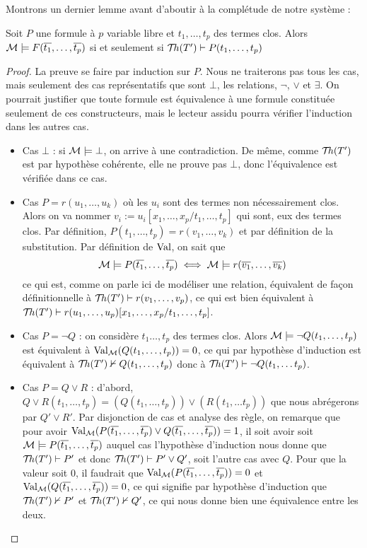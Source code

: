 Montrons un dernier lemme avant d'aboutir à la complétude de notre système :

\begin{lem}
    Soit $P$ une formule à $p$ variable libre et $t_1,\ldots, t_p$ des termes clos. Alors $\mathcal M\models F(\overline{t_1},\ldots,\overline{t_p})$ si et seulement si $\mathcal{T}\!h(T')\vdash P(t_1,\ldots,t_p)$
\end{lem}

\begin{proof}
    La preuve se faire par induction sur $P$. Nous ne traiterons pas tous les cas, mais seulement des cas représentatifs que sont $\bot$, les relations, $\lnot$, $\lor$ et $\exists$. On pourrait justifier que toute formule est équivalence à une formule constituée seulement de ces constructeurs, mais le lecteur assidu pourra vérifier l'induction dans les autres cas.
    \begin{itemize}[label=$\bullet$]
        \item Cas $\bot$ : si $\mathcal M\models \bot$, on arrive à une contradiction. De même, comme $\mathcal{T}\!h(T')$ est par hypothèse cohérente, elle ne prouve pas $\bot$, donc l'équivalence est vérifiée dans ce cas.
        \item Cas $P=r(u_1,\ldots,u_k)$ où les $u_i$ sont des termes non nécessairement clos. Alors on va nommer $v_i := u_i[x_1,\ldots,x_p/t_1,\ldots,t_p]$ qui sont, eux des termes clos. Par définition, $P(t_1,\ldots,t_p) = r(v_1,\ldots,v_k)$ et par définition de la substitution. Par définition de $\mathrm{Val}$, on sait que $$\mathcal M\models P(\overline{t_1},\ldots,\overline{t_p}) \iff \mathcal M\models r(\overline{v_1},\ldots,\overline{v_k})$$ ce qui est, comme on parle ici de modéliser une relation, équivalent de façon définitionnelle à $\mathcal{T}\!h(T')\vdash r(v_1,\ldots,v_p)$, ce qui est bien équivalent à $\mathcal{T}\!h(T')\vdash r(u_1,\ldots,u_p)[x_1,\ldots,x_p/t_1,\ldots,t_p]$.
        \item Cas $P = \lnot Q$ : on considère $t_1\ldots,t_p$ des termes clos. Alors $\mathcal M\models \lnot Q(t_1,\ldots,t_p)$ est équivalent à $\mathrm{Val}_{\mathcal M}(Q(t_1,\ldots,t_p))=0$, ce qui par hypothèse d'induction est équivalent à $\mathcal{T}\!h(T')\nvdash Q(t_1,\ldots,t_p)$ donc à $\mathcal{T}\!h(T')\vdash \lnot Q(t_1,\ldots t_p)$.
        \item Cas $P = Q\lor R$ : d'abord, $Q\lor R (t_1,\ldots,t_p) = (Q(t_1,\ldots,t_p))\lor (R(t_1,\ldots t_p))$ que nous abrégerons par $Q'\lor R'$. Par disjonction de cas et analyse des règle, on remarque que pour avoir $\mathrm{Val}_{\mathcal M}(P(\overline{t_1},\ldots,\overline{t_p})\lor Q(\overline{t_1},\ldots,\overline{t_p}))=1$, il soit avoir soit $\mathcal M\models P(\overline{t_1},\ldots,\overline{t_p})$ auquel cas l'hypothèse d'induction nous donne que $\mathcal{T}\!h(T')\vdash P'$ et donc $\mathcal{T}\!h(T')\vdash P'\lor Q'$, soit l'autre cas avec $Q$. Pour que la valeur soit $0$, il faudrait que $\mathrm{Val}_{\mathcal M}(P(\overline{t_1},\ldots,\overline{t_p}))=0$ et $\mathrm{Val}_{\mathcal M}(Q(\overline{t_1},\ldots,\overline{t_p}))=0$, ce qui signifie par hypothèse d'induction que $\mathcal{T}\!h(T')\nvdash P'$ et $\mathcal{T}\!h(T')\nvdash Q'$, ce qui nous donne bien une équivalence entre les deux.

\end{itemize}
\end{proof}
